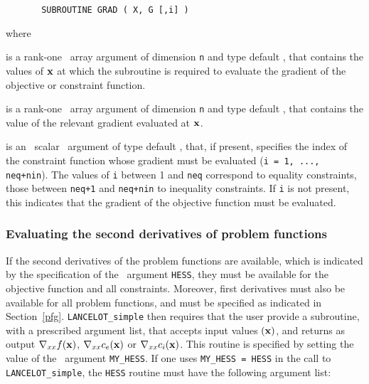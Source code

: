\documentclass{galahad}
\begin{document}
\def\baselinestretch{0.8}
{\tt \begin{verbatim}
       SUBROUTINE GRAD ( X, G [,i] )
\end{verbatim} }
\def\baselinestretch{1.0}
\noindent
where
\begin{description}
 is a rank-one \intentin\ array argument of 
dimension {\tt n} and type default \realdp,
that contains the values of ${\mathbf{x}}$ at which the
subroutine is required to evaluate the gradient
of the objective or constraint function.

 is a rank-one \intentout\ array argument of dimension {\tt n}  and
  type default \realdp, that contains the value of the relevant
  gradient evaluated at ${\mathbf{x}}$.

 is an \optional\ scalar \intentin\ argument of type default \integer,
that, if present, specifies the index of the constraint function whose
gradient must be evaluated  ({\tt i = 1, ..., neq+nin}).  The values of {\tt i}
between 1 and {\tt neq} correspond to equality constraints, those between
{\tt neq+1} and {\tt neq+nin} to inequality constraints. If {\tt i} is not
present, this indicates that the gradient of the objective function must be
evaluated.
\end{description}

\subsubsection{Evaluating the second derivatives of problem 
functions\label{pfh}}
 
If the second derivatives of the problem functions are available, which is
indicated by the specification of the \optional\ argument {\tt HESS}, they must
be available for the objective function and all constraints. Moreover, first
derivatives must also be available for all problem functions, and must be
specified as indicated in Section~\ref{pfg}.
{\tt LANCELOT\_simple} then requires that the user provide a subroutine, with
a prescribed argument list, that accepts input values $({\mathbf{x}})$, and returns as
output  $\nabla_{xx}f({\mathbf{x}})$,  $\nabla_{xx}c_e({\mathbf{x}})$ or
$\nabla_{xx}c_i({\mathbf{x}})$. This routine is specified by setting the value of the
\optional\ argument {\tt MY\_HESS}. If one uses {\tt MY\_HESS = HESS} in the
call to {\tt LANCELOT\_simple}, the {\tt HESS} routine must have the following 
argument list:
\end{document}
